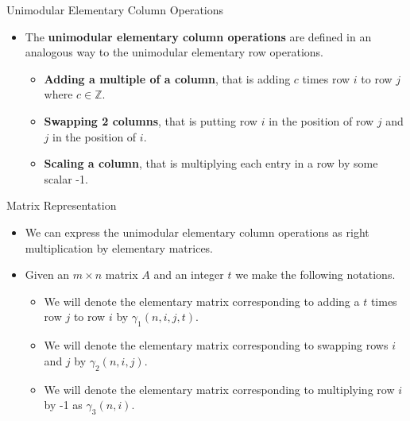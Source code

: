 \documentclass{beamer}
\begin{document}
\begin{frame}{Unimodular Elementary Column Operations}
    \begin{itemize}
        \item The \textbf{unimodular elementary column operations} are defined in an analogous way to the unimodular elementary row operations.
        \begin{itemize}
            \item \textbf{Adding a multiple of a column}, that is adding $c$ times row $i$ to row $j$ where $c \in \mathbb{Z}$.
            \item \textbf{Swapping 2 columns}, that is putting row $i$ in the position of row $j$ and $j$ in the position of $i$.
            \item \textbf{Scaling a column}, that is multiplying each entry in a row by some scalar -1.
        \end{itemize}
    \end{itemize}
\end{frame}
\begin{frame}{Matrix Representation}
    \begin{itemize}
        \item We can express the unimodular elementary column operations as right multiplication by elementary matrices.
        \item Given an $m \times n$ matrix $A$ and an integer $t$ we make the following notations.
        \begin{itemize}
            \item We will denote the elementary matrix corresponding to adding a $t$ times row $j$ to row $i$ by $\gamma_1(n, i, j, t)$.
            \item We will denote the elementary matrix corresponding to swapping rows $i$ and $j$ by $\gamma_2(n, i, j)$.
            \item We will denote the elementary matrix corresponding to multiplying row $i$ by -1 as $\gamma_3(n, i)$.
        \end{itemize}
    \end{itemize}
\end{frame}
\end{document}
